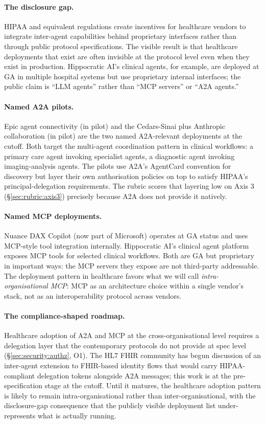 \paragraph{The disclosure gap.}
HIPAA and equivalent regulations create incentives for
healthcare vendors to integrate inter-agent
capabilities behind proprietary interfaces rather than
through public protocol specifications. The visible
result is that healthcare deployments that exist are
often invisible at the protocol level even when they
exist in production. Hippocratic AI's clinical agents,
for example, are deployed at GA in multiple hospital
systems but use proprietary internal interfaces; the
public claim is ``LLM agents'' rather than ``MCP
servers'' or ``A2A agents.''

\paragraph{Named A2A pilots.}
Epic agent connectivity (in pilot) and the Cedars-Sinai
plus Anthropic collaboration (in pilot) are the two
named A2A-relevant deployments at the cutoff. Both
target the multi-agent coordination pattern in clinical
workflows: a primary care agent invoking specialist
agents, a diagnostic agent invoking imaging-analysis
agents. The pilots use A2A's AgentCard convention for
discovery but layer their own authorisation policies
on top to satisfy HIPAA's principal-delegation
requirements. The rubric scores that layering low
on Axis 3 (\S\ref{sec:rubric:axis3}) precisely because
A2A does not provide it natively.

\paragraph{Named MCP deployments.}
Nuance DAX Copilot (now part of Microsoft) operates at
GA status and uses MCP-style tool integration
internally. Hippocratic AI's clinical agent platform
exposes MCP tools for selected clinical workflows.
Both are GA but proprietary in important ways: the
MCP servers they expose are not third-party
addressable. The deployment pattern in healthcare
favors what we will call \emph{intra-organisational
MCP}: MCP as an architecture choice within a single
vendor's stack, not as an interoperability protocol
across vendors.

\paragraph{The compliance-shaped roadmap.}
Healthcare adoption of A2A and MCP at the
cross-organisational level requires a delegation layer
that the contemporary protocols do not provide at
spec level (\S\ref{sec:security:authz}, O1). The HL7
FHIR community has begun discussion of an
inter-agent extension to FHIR-based identity flows
that would carry HIPAA-compliant delegation tokens
alongside A2A messages; this work is at the
pre-specification stage at the cutoff. Until it
matures, the healthcare adoption pattern is likely to
remain intra-organisational rather than
inter-organisational, with the
disclosure-gap consequence that the publicly visible
deployment list under-represents what is actually
running.

